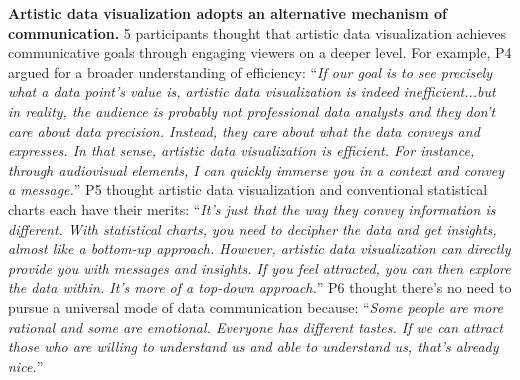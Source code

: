 \textbf{Artistic data visualization adopts an alternative mechanism of communication.}
5 participants thought that artistic data visualization achieves communicative goals through engaging viewers on a deeper level. For example, P4 argued for a broader understanding of efficiency: ``\textit{If our goal is to see precisely what a data point's value is, artistic data visualization is indeed inefficient...but in reality, the audience is probably not professional data analysts and they don't care about data precision. Instead, they care about what the data conveys and expresses. In that sense, artistic data visualization is efficient. For instance, through audiovisual elements, I can quickly immerse you in a context and convey a message.}''
P5 thought artistic data visualization and conventional statistical charts each have their merits: ``\textit{It's just that the way they convey information is different. With statistical charts, you need to decipher the data and get insights, almost like a bottom-up approach. However, artistic data visualization can directly provide you with messages and insights. If you feel attracted, you can then explore the data within. It's more of a top-down approach.}''
P6 thought there's no need to pursue a universal mode of data communication because: ``\textit{Some people are more rational and some are emotional. Everyone has different tastes. If we can attract those who are willing to understand us and able to understand us, that's already nice.}''


